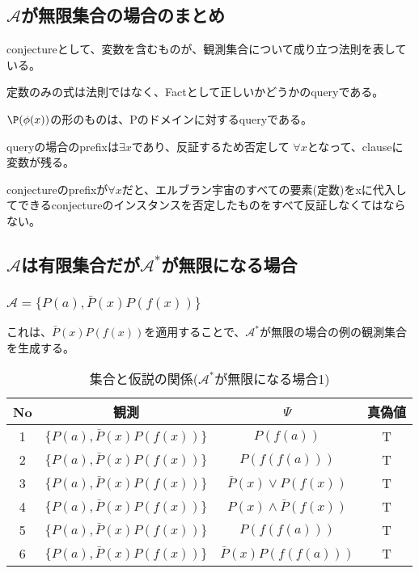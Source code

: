 \documentclass[10pt, oneside]{jarticle}   	%
\theoremstyle{definition}
\newcommand{\eset}[1]{\{{#1}\}}
\newcommand{\clos}[1]{\mathcal{#1}^{*}}
\begin{document}
\subsection{$\mathcal{A}$が無限集合の場合のまとめ}
conjectureとして、変数を含むものが、観測集合について成り立つ法則を表している。

定数のみの式は法則ではなく、Factとして正しいかどうかのqueryである。

$\P(\phi(x))$の形のものは、Pのドメインに対するqueryである。

queryの場合のprefixは$\exists x$であり、反証するため否定して $\forall x$となって、clauseに変数が残る。

conjectureのprefixが$\forall x$だと、エルブラン宇宙のすべての要素(定数)をxに代入してできるconjectureのインスタンスを否定したものをすべて反証しなくてはならない。


\newpage
\subsection{ $\mathcal{A}$は有限集合だが$\clos{A}$が無限になる場合}
\subsubsection{$\mathcal{A}=\eset{P(a),  \bar{P}(x)P(f(x))}$}
これは、$\bar{P}(x)P(f(x))$を適用することで、$\clos{A}$が無限の場合の例の観測集合を生成する。

\begin{table}[htbp]
 \centering
 \begin{tabular}{|c|c|c|c|}\hline
   No & 観測 & $\Psi$ & 真偽値 \\ \hline
   1 & $\eset{P(a), \bar{P}(x)P(f(x))}$ & $P(f(a))$ & T \\ \hline
   2 & $\eset{P(a), \bar{P}(x)P(f(x))}$ & $P(f(f(a)))$ & T \\ \hline
   3 & $\eset{P(a), \bar{P}(x)P(f(x))}$ & $\bar{P}(x) \lor P(f(x))$ & T \\ \hline
   4 & $\eset{P(a), \bar{P}(x)P(f(x))}$ & $P(x) \land \bar{P}(f(x))$ & T \\ \hline
   5 & $\eset{P(a), \bar{P}(x)P(f(x))}$ & $P(f(f(a)))$ & T \\ \hline
   6 & $\eset{P(a), \bar{P}(x)P(f(x))}$ & $\bar{P}(x)P(f(f(a)))$ & T \\ \hline
 \end{tabular}
 \caption{集合と仮説の関係($\clos{A}$が無限になる場合1)}
 \label{tab:ex0401}
\end{table}
\end{document}
